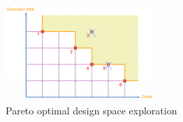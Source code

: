 \begin{figure}[h]
	\begin{center}
		\includegraphics[width=0.5\textwidth]{images/Design_space_exploration.png}
		\caption{Pareto optimal design space exploration}
	\end{center}
\end{figure}











